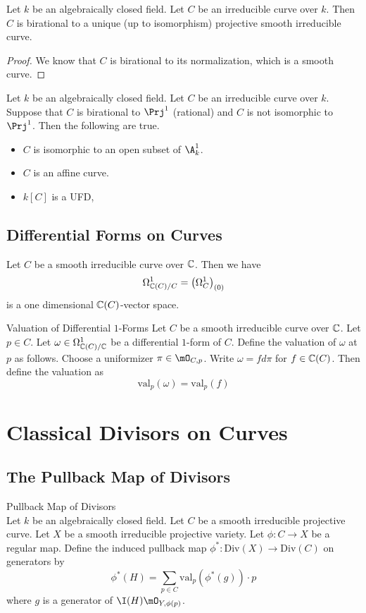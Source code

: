 \documentclass[a4paper]{article}
\begin{document}
\begin{prp}{}{} Let $k$ be an algebraically closed field. Let $C$ be an irreducible curve over $k$. Then $C$ is birational to a unique (up to isomorphism) projective smooth irreducible curve. 
\begin{proof}
We know that $C$ is birational to its normalization, which is a smooth curve. 
\end{proof}
\end{prp}

\begin{prp}{}{} Let $k$ be an algebraically closed field. Let $C$ be an irreducible curve over $k$. Suppose that $C$ is birational to $\Prj^1$ (rational) and $C$ is not isomorphic to $\Prj^1$. Then the following are true. 
\begin{itemize}
\item $C$ is isomorphic to an open subset of $\A_k^1$. 
\item $C$ is an affine curve. 
\item $k[C]$ is a UFD, 
\end{itemize}
\end{prp}

\subsection{Differential Forms on Curves}
\begin{prp}{}{} Let $C$ be a smooth irreducible curve over $\mathbb{C}$. Then we have $$\Omega_{\mathbb{C}(C)/C}^1=\left(\Omega_C^1\right)_{(0)}$$ is a one dimensional $\mathbb{C}(C)$-vector space. 
\end{prp}

\begin{defn}{Valuation of Differential $1$-Forms}{} Let $C$ be a smooth irreducible curve over $\mathbb{C}$. Let $p\in C$. Let $\omega\in\Omega_{\mathbb{C}(C)/\mathbb{C}}^1$ be a differential $1$-form of $C$. Define the valuation of $\omega$ at $p$ as follows. Choose a uniformizer $\pi\in\mO_{C,p}$. Write $\omega=fd\pi$ for $f\in\mathbb{C}(C)$. Then define the valuation as $$\text{val}_p(\omega)=\text{val}_p(f)$$
\end{defn}

\pagebreak
\section{Classical Divisors on Curves}
\subsection{The Pullback Map of Divisors}
\begin{defn}{Pullback Map of Divisors}{}\\
Let $k$ be an algebraically closed field. Let $C$ be a smooth irreducible projective curve. Let $X$ be a smooth irreducible projective variety. Let $\phi:C\to X$ be a regular map. Define the induced pullback map $\phi^\ast:\text{Div}(X)\to\text{Div}(C)$ on generators by $$\phi^\ast(H)=\sum_{p\in C}\text{val}_p(\phi^\ast(g))\cdot p$$ where $g$ is a generator of $\I(H)\mO_{Y,\phi(p)}$. 
\end{defn}
\end{document}
